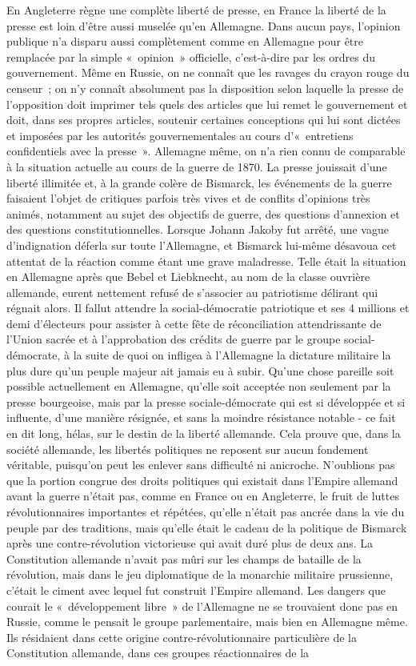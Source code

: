\documentclass[french,twoside]{book} %
\begin{document}
En Angleterre règne une complète liberté de presse, en France la liberté de la presse est loin d’être aussi muselée qu’en Allemagne. Dans aucun pays, l’opinion publique n’a disparu aussi complètement comme en Allemagne pour être remplacée par la simple « opinion » officielle, c’est-à-dire par les ordres du gouvernement. Même en Russie, on ne connaît que les ravages du crayon rouge du censeur ; on n’y connaît absolument pas la disposition selon laquelle la presse de l’opposition doit imprimer tels quels des articles que lui remet le gouvernement et doit, dans ses propres articles, soutenir certaines conceptions qui lui sont dictées et imposées par les autorités gouvernementales au cours d’« entretiens confidentiels avec la presse ». Allemagne même, on n’a rien connu de comparable à la situation actuelle au cours de la guerre de 1870. La presse jouissait d’une liberté illimitée et, à la grande colère de Bismarck, les événements de la guerre faisaient l’objet de critiques parfois très vives et de conflits d’opinions très animés, notamment au sujet des objectifs de guerre, des questions d’annexion et des questions constitutionnelles. Lorsque Johann Jakoby fut arrêté, une vague d’indignation déferla sur toute l’Allemagne, et Bismarck lui-même désavoua cet attentat de la réaction comme étant une grave maladresse. Telle était la situation en Allemagne après que Bebel et Liebknecht, au nom de la classe ouvrière allemande, eurent nettement refusé de s’associer au patriotisme délirant qui régnait alors. Il fallut attendre la social-démocratie patriotique et ses 4 millions et  demi d’électeurs pour assister à cette fête de réconciliation attendrissante de l’Union sacrée et à l’approbation des crédits de guerre par le groupe social-démocrate, à la suite de quoi on infligea à l’Allemagne la dictature militaire la plus dure qu’un peuple majeur ait jamais eu à subir. Qu'une chose pareille soit possible actuellement en Allemagne, qu’elle soit acceptée non seulement par la presse bourgeoise, mais par la presse sociale-démocrate qui est si développée et si influente, d’une manière résignée, et sans la moindre résistance notable - ce fait en dit long, hélas, sur le destin de la liberté allemande. Cela prouve que, dans la société allemande, les libertés politiques ne reposent sur aucun fondement véritable, puisqu’on peut les enlever sans difficulté ni anicroche. N'oublions pas que la portion congrue des droits politiques qui existait dans l’Empire allemand avant la guerre n’était pas, comme en France ou en Angleterre, le fruit de luttes révolutionnaires importantes et répétées, qu’elle n’était pas ancrée dans la vie du peuple par des traditions, mais qu’elle était le cadeau de la politique de Bismarck après une contre-révolution victorieuse qui avait duré plus de deux ans. La Constitution allemande n’avait pas mûri sur les champs de bataille de la révolution, mais dans le jeu diplomatique de la monarchie militaire prussienne, c’était le ciment avec lequel fut construit l’Empire allemand. Les dangers que courait le « développement libre » de l’Allemagne ne se trouvaient donc pas en Russie, comme le pensait le groupe parlementaire, mais bien en Allemagne même. Ils résidaient dans cette origine contre-révolutionnaire particulière de la Constitution allemande, dans ces groupes réactionnaires de la 
\end{document}
